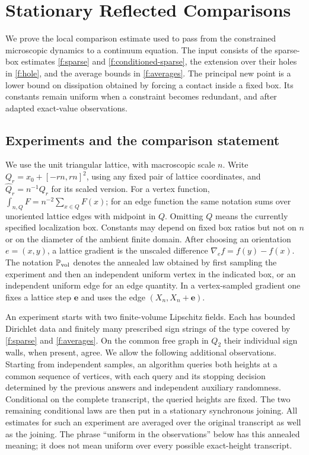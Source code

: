 \section{Stationary Reflected Comparisons}\label{s:coupling}

We prove the local comparison estimate used to pass from the constrained
microscopic dynamics to a continuum equation. The input consists of the
sparse-box estimates \ref{f:sparse} and \ref{f:conditioned-sparse}, the
extension over their holes in \ref{f:hole}, and the average bounds in
\ref{f:averages}. The principal new
point is a lower bound on dissipation obtained by forcing a contact inside
a fixed box. Its constants remain uniform when a constraint becomes
redundant, and after adapted exact-value observations.

\subsection{Experiments and the comparison statement}

We use the unit triangular lattice, with macroscopic scale $n$. Write
$Q_r=x_0+[-rn,rn]^2$, using any fixed pair of lattice coordinates, and
$\widehat Q_r=n^{-1}Q_r$ for its scaled version. For a vertex function,
$\int_{n,Q}F=n^{-2}\sum_{x\in Q}F(x)$; for an edge function the same
notation sums over unoriented lattice edges with midpoint in $Q$.
Omitting $Q$ means the currently specified localization box.
Constants may depend on fixed box ratios but not on $n$ or on the
diameter of the ambient finite domain. After choosing an orientation
$e=(x,y)$, a lattice gradient is the unscaled difference
$\nabla_e f=f(y)-f(x)$.
The notation $\mathbb P_{\rm vol}$ denotes the annealed law obtained by
first sampling the experiment and then an independent uniform vertex
in the indicated box, or an independent uniform edge for an edge
quantity. In a vertex-sampled gradient one fixes a lattice step
$\mathbf e$ and uses the edge $(X_n,X_n+\mathbf e)$.

An experiment starts with two finite-volume Lipschitz fields. Each has
bounded Dirichlet data and finitely many prescribed sign strings of the
type covered by \ref{f:sparse} and \ref{f:averages}. On the common free
graph in $Q_2$ their individual sign walls, when present, agree. We allow
the following additional observations. Starting from independent samples,
an algorithm queries both heights at a common sequence of vertices, with
each query and its stopping decision determined by the previous answers
and independent auxiliary randomness. Conditional on the complete
transcript, the queried heights are fixed. The two remaining conditional
laws are then put in a stationary synchronous joining. All estimates for
such an experiment are averaged over the original transcript as well as
the joining. The phrase ``uniform in the observations'' below has this
annealed meaning; it does not mean uniform over every possible exact-height
transcript.

